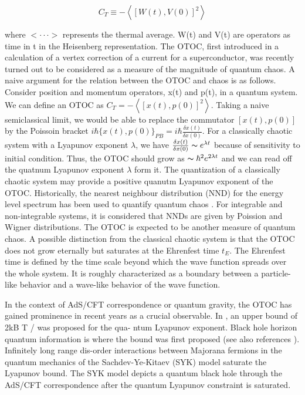 \documentclass[12pt]{report}
\newcommand*{\1}{\hspace{1pt}}
\begin{document}
    \begin{equation}
        C_{T} \equiv  - \left\langle\left[W(t),V(0)\right]^{2}\right\rangle
    \end{equation}

    where $<\cdot \cdot \cdot >$ represents the thermal average. W(t) and V(t) are operators as time in t in the Heisenberg representation. The OTOC, first introduced
    in a calculation of a vertex correction of a current for a superconductor\cite{s12}, was recently turned out to be considered as a measure of the magnitude of 
    quantum chaos. A naive argument for the relation between the OTOC and chaos is as follows\cite{s13}. Consider position and momentum operators, x(t) and p(t), in a
    quantum system. We can define an OTOC as $C_{T} = - \left\langle\left[x(t),p(0)\right]^{2}\right\rangle$. Taking a naive semiclassical limit, we would be able to 
    replace the commutator $\left[x(t),p(0)\right]$ by the Poissoin bracket $i\hbar\{x(t),p(0)\}_{PB} = i\hbar\frac{\delta x(t)}{\delta x(0)}$. For a classically 
    chaotic system with a Lyapunov exponent $\lambda$, we have $\frac{\delta x(t)}{\delta x(0)}\thicksim  e^{\lambda t}$ because of sensitivity to initial condition.
    Thus, the OTOC should grow as $\thicksim \hbar^{2}e^{2\lambda t}$ and we can read off the quatnum Lyapunov exponent $\lambda$ form it. The quantization of a 
    classically chaotic system may provide a positive quanutm Lyapunov exponent of the OTOC. Historically, the nearest neighbour distribution (NND) for the energy
    level spectrum has been used to quantify quantum chaos \cite{s14}. For integrable and non-integrable systems, it is considered that NNDs are given by Poission
    and Wigner distributions. The OTOC is expected to be another measure of quantum chaos. A possible distinction from the classical chaotic system is that the 
    OTOC does not grow eternally but saturates at the Ehrenfest time $t_{E}$. The Ehrenfest time is defined by the time scale beyond which the wave function spreads
    over the whole system. It is roughly characterized as a boundary between a particle-like behavior and a wave-like behavior of the wave function.

    In the context of AdS/CFT correspondence \cite{s16} or quantum gravity, the OTOC has gained prominence in recent years as a crucial observable. In \cite{s17}, 
    an upper bound of 2kB T / was proposed for the qua- ntum Lyapunov exponent. Black hole horizon quantum information is where the bound was first proposed \cite{s18,s19} (see
    also references \cite{s20,s21,s22,s23,s24}). Infinitely long range dis-order interactions between Majorana fermions in the quantum mechanics of the Sachdev-Ye-Kitaev (SYK) model 
    \cite{s25,s26} saturate the Lyapunov bound. The SYK model depicts a quantum black hole through the AdS/CFT correspondence after the quantum Lyapunov constraint is saturated.
\end{document}
